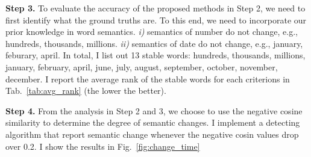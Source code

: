 \documentclass[a4paper]{article}
\theoremstyle{plain}
\theoremstyle{definition}
\begin{document}
\begin{table}[h]
\centering
{}
\caption{Pearson correlation between different criterions.}
\label{tab:change_pearson}
\end{table}

\noindent\textbf{Step 3.} To evaluate the accuracy of the proposed methods in Step 2, we need to first identify what the ground truths are.
To this end, we need to incorporate our prior knowledge in word semantics. 
\textit{i)} semantics of number do not change, e.g., hundreds, thousands, millions.
\textit{ii)} semantics of date do not change, e.g., january, feburary, april.
In total, I list out 13 stable words: hundreds, thousands, millions, january, february, april, june, july, august, september, october, november, december.
I report the average rank of the stable words for each criterions in Tab.~\ref{tab:avg_rank} (the lower the better).

\begin{table}[h]
\centering
{}
\caption{The average rank of stable words (the lower the better).}
\label{tab:avg_rank}
\end{table}

\noindent\textbf{Step 4.} From the analysis in Step 2 and 3, we choose to use the negative cosine similarity to determine the degree of semantic changes. 
I implement a detecting algorithm that report semantic change whenever the negative cosin values drop over 0.2.
I show the results in Fig.~\ref{fig:change_time}
\end{document}
